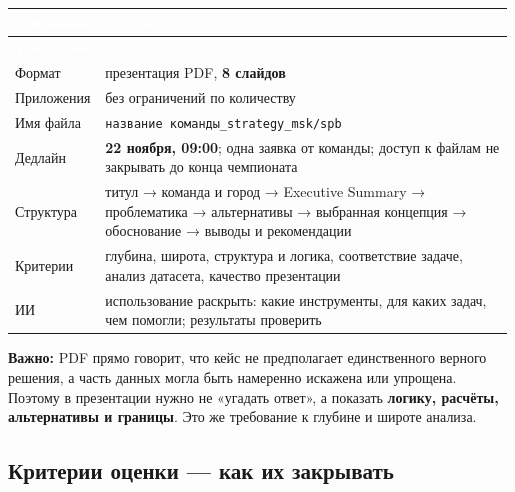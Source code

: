 \documentclass[10pt,a4paper]{article}
\begin{document}
\begingroup
\small
\setlength{\tabcolsep}{3pt}
\renewcommand{\arraystretch}{1.12}
\begin{longtable}{@{}>{\raggedright\arraybackslash}p{0.1764\linewidth}>{\raggedright\arraybackslash}p{0.8113\linewidth}@{}}
\rowcolor{blue}
\textcolor{white}{\textbf{Требование}} & \textcolor{white}{\textbf{Деталь}} \\
\endfirsthead
\rowcolor{blue}
\textcolor{white}{\textbf{Требование}} & \textcolor{white}{\textbf{Деталь}} \\
\endhead
\hline
Формат & презентация PDF, \textbf{8 слайдов} \\
Приложения & без ограничений по количеству \\
Имя файла & \texttt{название команды\_strategy\_msk/spb} \\
Дедлайн & \textbf{22 ноября, 09:00}; одна заявка от команды; доступ к файлам не закрывать до конца чемпионата \\
Структура & титул → команда и город → Executive Summary → проблематика → альтернативы → выбранная концепция → обоснование → выводы и рекомендации \\
Критерии & глубина, широта, структура и логика, соответствие задаче, анализ датасета, качество презентации \\
ИИ & использование раскрыть: какие инструменты, для каких задач, чем помогли; результаты проверить \\
\hline
\end{longtable}
\endgroup
\vspace{4pt}

\textbf{Важно:} PDF прямо говорит, что кейс не предполагает единственного верного решения, а часть данных могла быть намеренно искажена или упрощена. Поэтому в презентации нужно не «угадать ответ», а показать \textbf{логику, расчёты, альтернативы и границы}. Это же требование к глубине и широте анализа.\par

\subsection{Критерии оценки — как их закрывать}
\end{document}
